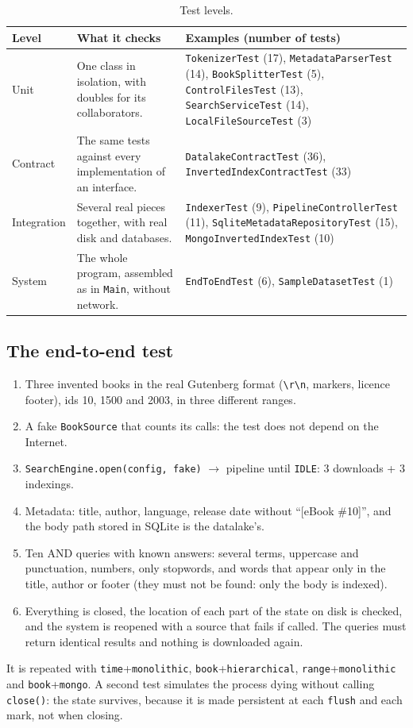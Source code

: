 \documentclass[11pt,a4paper]{article}
\newcommand{\code}[1]{\texttt{#1}}
\begin{document}
\begin{table}[H]
\centering\small
\begin{tabularx}{\linewidth}{@{}l Y Y@{}}
\toprule
Level & What it checks & Examples (number of tests) \\
\midrule
Unit & One class in isolation, with doubles for its collaborators. & \code{TokenizerTest} (17), \code{MetadataParserTest} (14), \code{BookSplitterTest} (5), \code{ControlFilesTest} (13), \code{SearchServiceTest} (14), \code{LocalFileSourceTest} (3) \\
Contract & The same tests against every implementation of an interface. & \code{DatalakeContractTest} (36), \code{InvertedIndexContractTest} (33) \\
Integration & Several real pieces together, with real disk and databases. & \code{IndexerTest} (9), \code{PipelineControllerTest} (11), \code{SqliteMetadataRepositoryTest} (15), \code{MongoInvertedIndexTest} (10) \\
System & The whole program, assembled as in \code{Main}, without network. & \code{EndToEndTest} (6), \code{SampleDatasetTest} (1) \\
\bottomrule
\end{tabularx}
\caption{Test levels.}
\end{table}

\subsection{The end-to-end test}
\begin{enumerate}
  \item Three invented books in the real Gutenberg format (\code{\textbackslash r\textbackslash n},
        markers, licence footer), ids 10, 1500 and 2003, in three different ranges.
  \item A fake \code{BookSource} that counts its calls: the test does not depend on the Internet.
  \item \code{SearchEngine.open(config, fake)} $\rightarrow$ pipeline until \code{IDLE}: 3 downloads
        + 3 indexings.
  \item Metadata: title, author, language, release date without ``[eBook \#10]'', and the body path
        stored in SQLite is the datalake's.
  \item Ten AND queries with known answers: several terms, uppercase and punctuation, numbers, only
        stopwords, and words that appear only in the title, author or footer (they must not be
        found: only the body is indexed).
  \item Everything is closed, the location of each part of the state on disk is checked, and the
        system is reopened with a source that fails if called. The queries must return identical
        results and nothing is downloaded again.
\end{enumerate}
It is repeated with \code{time}+\code{monolithic}, \code{book}+\code{hierarchical},
\code{range}+\code{monolithic} and \code{book}+\code{mongo}. A second test simulates the process
dying without calling \code{close()}: the state survives, because it is made persistent at each
\code{flush} and each mark, not when closing.
\end{document}
